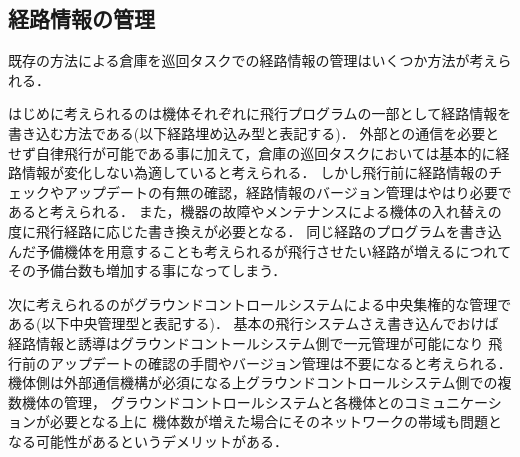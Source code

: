 \subsection{経路情報の管理}
\label{route_problem}

既存の方法による倉庫を巡回タスクでの経路情報の管理はいくつか方法が考えられる．

はじめに考えられるのは機体それぞれに飛行プログラムの一部として経路情報を書き込む方法である(以下経路埋め込み型と表記する)．
外部との通信を必要とせず自律飛行が可能である事に加えて，倉庫の巡回タスクにおいては基本的に経路情報が変化しない為適していると考えられる．
しかし飛行前に経路情報のチェックやアップデートの有無の確認，経路情報のバージョン管理はやはり必要であると考えられる．
また，機器の故障やメンテナンスによる機体の入れ替えの度に飛行経路に応じた書き換えが必要となる．
同じ経路のプログラムを書き込んだ予備機体を用意することも考えられるが飛行させたい経路が増えるにつれてその予備台数も増加する事になってしまう．

次に考えられるのがグラウンドコントロールシステムによる中央集権的な管理である(以下中央管理型と表記する)．
基本の飛行システムさえ書き込んでおけば経路情報と誘導はグラウンドコントールシステム側で一元管理が可能になり
飛行前のアップデートの確認の手間やバージョン管理は不要になると考えられる．
機体側は外部通信機構が必須になる上グラウンドコントロールシステム側での複数機体の管理，
グラウンドコントロールシステムと各機体とのコミュニケーションが必要となる上に
機体数が増えた場合にそのネットワークの帯域も問題となる可能性があるというデメリットがある．